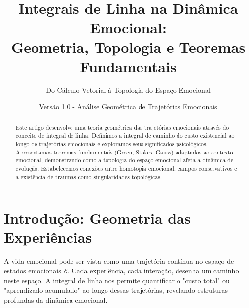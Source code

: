 \documentclass[12pt, a4paper]{article}
\title{Integrais de Linha na Dinâmica Emocional: \\
       Geometria, Topologia e Teoremas Fundamentais}
\author{Do Cálculo Vetorial à Topologia do Espaço Emocional}
\date{Versão 1.0 - Análise Geométrica de Trajetórias Emocionais}
\begin{document}
\maketitle

\begin{abstract}
Este artigo desenvolve uma teoria geométrica das trajetórias emocionais através do conceito de integral de linha. Definimos a integral de caminho do custo existencial ao longo de trajetórias emocionais e exploramos seus significados psicológicos. Apresentamos teoremas fundamentais (Green, Stokes, Gauss) adaptados ao contexto emocional, demonstrando como a topologia do espaço emocional afeta a dinâmica de evolução. Estabelecemos conexões entre homotopia emocional, campos conservativos e a existência de traumas como singularidades topológicas.
\end{abstract}

\tableofcontents

\section{Introdução: Geometria das Experiências}

A vida emocional pode ser vista como uma trajetória contínua no espaço de estados emocionais $\mathcal{E}$. Cada experiência, cada interação, desenha um caminho neste espaço. A integral de linha nos permite quantificar o "custo total" ou "aprendizado acumulado" ao longo dessas trajetórias, revelando estruturas profundas da dinâmica emocional.

\begin{center}
\end{center}
\end{document}
